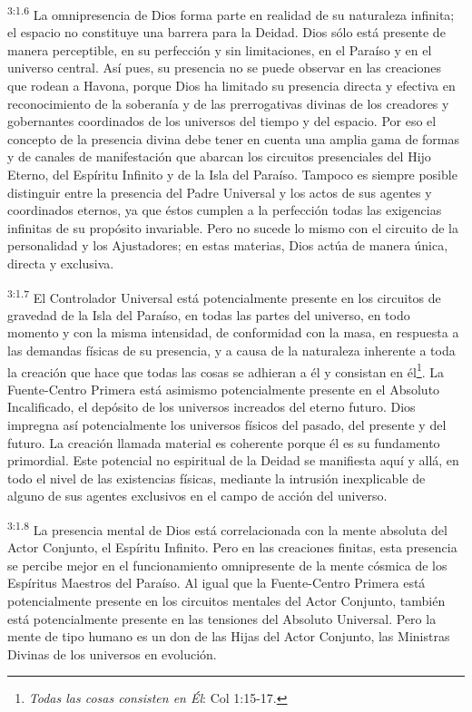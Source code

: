 \par
\textsuperscript{3:1.6} La omnipresencia de Dios forma parte en realidad de su naturaleza infinita; el espacio no constituye una barrera para la Deidad. Dios sólo está presente de manera perceptible, en su perfección y sin limitaciones, en el Paraíso y en el universo central. Así pues, su presencia no se puede observar en las creaciones que rodean a Havona, porque Dios ha limitado su presencia directa y efectiva en reconocimiento de la soberanía y de las prerrogativas divinas de los creadores y gobernantes coordinados de los universos del tiempo y del espacio. Por eso el concepto de la presencia divina debe tener en cuenta una amplia gama de formas y de canales de manifestación que abarcan los circuitos presenciales del Hijo Eterno, del Espíritu Infinito y de la Isla del Paraíso. Tampoco es siempre posible distinguir entre la presencia del Padre Universal y los actos de sus agentes y coordinados eternos, ya que éstos cumplen a la perfección todas las exigencias infinitas de su propósito invariable. Pero no sucede lo mismo con el circuito de la personalidad y los Ajustadores; en estas materias, Dios actúa de manera única, directa y exclusiva.

\par
\textsuperscript{3:1.7} El Controlador Universal está potencialmente presente en los circuitos de gravedad de la Isla del Paraíso, en todas las partes del universo, en todo momento y con la misma intensidad, de conformidad con la masa, en respuesta a las demandas físicas de su presencia, y a causa de la naturaleza inherente a toda la creación que hace que todas las cosas se adhieran a él y consistan en él\footnote{\textit{Todas las cosas consisten en Él}: Col 1:15-17.}. La Fuente-Centro Primera está asimismo potencialmente presente en el Absoluto Incalificado, el depósito de los universos increados del eterno futuro. Dios impregna así potencialmente los universos físicos del pasado, del presente y del futuro. La creación llamada material es coherente porque él es su fundamento primordial. Este potencial no espiritual de la Deidad se manifiesta aquí y allá, en todo el nivel de las existencias físicas, mediante la intrusión inexplicable de alguno de sus agentes exclusivos en el campo de acción del universo.

\par
\textsuperscript{3:1.8} La presencia mental de Dios está correlacionada con la mente absoluta del Actor Conjunto, el Espíritu Infinito. Pero en las creaciones finitas, esta presencia se percibe mejor en el funcionamiento omnipresente de la mente cósmica de los Espíritus Maestros del Paraíso. Al igual que la Fuente-Centro Primera está potencialmente presente en los circuitos mentales del Actor Conjunto, también está potencialmente presente en las tensiones del Absoluto Universal. Pero la mente de tipo humano es un don de las Hijas del Actor Conjunto, las Ministras Divinas de los universos en evolución.

